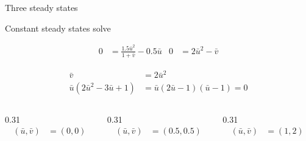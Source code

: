 \begin{frame}{Three steady states}

  \vspace{-0.30cm}

  {\color{HydraMuted}\fontsize{7.7}{9.4}\selectfont
    Constant steady states solve
  \par}

  \vspace{-0.34cm}

  {\color{HydraWhite}\fontsize{9.7}{12.3}\selectfont
  \begin{align*}
    0
    &=
    \frac{1.5\bar u^2}{1+\bar v}
    -
    0.5\bar u
    &
    0
    &=
    2\bar u^2-\bar v
  \end{align*}
  }

  \vspace{-0.46cm}

  {\color{HydraWhite}\fontsize{9.4}{11.9}\selectfont
  \begin{align*}
    \bar v
    &=
    2\bar u^2
    \\
    \bar u\left(2\bar u^2-3\bar u+1\right)
    &=
    \bar u\left(2\bar u-1\right)\left(\bar u-1\right)
    =
    0
  \end{align*}
  }

  \vspace{-0.34cm}

  \begin{columns}[c,onlytextwidth]

    \begin{column}{0.31\textwidth}
      \centering
      {\color{HydraWhite}\bfseries\fontsize{13}{16}\selectfont
      \begin{align*}
        (\bar u,\bar v)
        &=
        (0,0)
      \end{align*}
      }
    \end{column}

    \begin{column}{0.31\textwidth}
      \centering
      {\color{HydraRed}\bfseries\fontsize{13}{16}\selectfont
      \begin{align*}
        (\bar u,\bar v)
        &=
        (0.5,0.5)
      \end{align*}
      }
    \end{column}

    \begin{column}{0.31\textwidth}
      \centering
      {\color{HydraGreen}\bfseries\fontsize{13}{16}\selectfont
      \begin{align*}
        (\bar u,\bar v)
        &=
        (1,2)
      \end{align*}
      }
    \end{column}

  \end{columns}

\end{frame}


